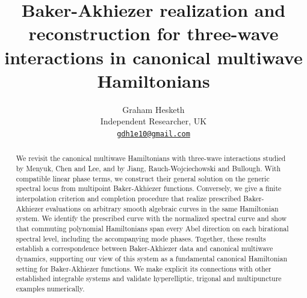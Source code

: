 \documentclass[11pt,a4paper]{article}
\title{Baker-Akhiezer realization and reconstruction for three-wave
interactions in canonical multiwave Hamiltonians}
\author{Graham Hesketh\\
Independent Researcher, UK\\
\href{mailto:gdh1e10@gmail.com}{\texttt{gdh1e10@gmail.com}}}
\date{}
\numberwithin{equation}{section}
\begin{document}
\maketitle

\begin{abstract}
We revisit the canonical multiwave Hamiltonians with three-wave
interactions studied by Menyuk, Chen and Lee, and by Jiang,
Rauch-Wojciechowski and Bullough. With compatible linear phase terms, we construct
their general solution on the generic spectral locus from multipoint
Baker-Akhiezer functions. Conversely, we give a finite interpolation
criterion and completion procedure that realize prescribed
Baker-Akhiezer evaluations on arbitrary smooth algebraic curves in
the same Hamiltonian system. We identify the prescribed curve with
the normalized spectral curve and show that commuting polynomial
Hamiltonians span every Abel direction on each birational spectral
level, including the accompanying mode phases. Together, these
results establish a correspondence between Baker-Akhiezer data and
canonical multiwave dynamics, supporting our view of this system as
a fundamental canonical Hamiltonian setting for Baker-Akhiezer
functions. We make explicit its connections with other established
integrable systems and validate hyperelliptic, trigonal and
multipuncture examples numerically.
\end{abstract}

\clearpage
\begingroup
\makeatletter
\renewcommand{\@pnumwidth}{2.5em}
\renewcommand{\@tocrmarg}{3.5em}
\makeatother
\tableofcontents
\endgroup
\clearpage

















\appendix













\end{document}

